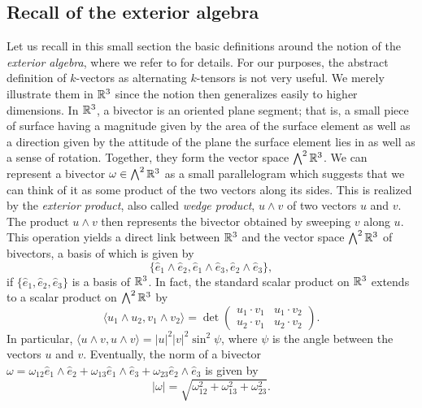 \subsection{Recall of the exterior algebra}
Let us recall in this small section the basic definitions around the notion of the \emph{exterior algebra}, where we refer to \cite{Lounesto2006} for details. For our purposes, the abstract definition of $k$-vectors as alternating $k$-tensors is not very useful. We merely illustrate them in $\mathbb{R}^3$ since the notion then generalizes easily to higher dimensions. In $\mathbb{R}^3$, a bivector is an oriented plane segment; that is, a small piece of surface having a magnitude given by the area of the surface element as well as a direction given by the attitude of the plane the surface element lies in as well as a sense of rotation. Together, they form the vector space $\bigwedge^2 \mathbb{R}^3$. We can represent a bivector $\omega \in \bigwedge^2 \mathbb{R}^3$ as a small parallelogram which suggests that we can think of it as some product of the two vectors along its sides. This is realized by the \emph{exterior product}, also called \emph{wedge product}, $u \wedge v$ of two vectors $u$ and $v$. The product $u \wedge v$ then represents the bivector obtained by sweeping $v$ along $u$. This operation yields a direct link between $\mathbb{R}^3$ and the vector space $\bigwedge^2 \mathbb{R}^3$ of bivectors, a basis of which is given by
\begin{equation}
 \{\hat{e}_1 \wedge \hat{e}_2, \hat{e}_1 \wedge \hat{e}_3, \hat{e}_2 \wedge \hat{e}_3\},
\end{equation}
if $\{\hat{e}_1, \hat{e}_2, \hat{e}_3\}$ is a basis of $\mathbb{R}^3$. In fact, the standard scalar product on $\mathbb{R}^3$ extends to a scalar product on $\bigwedge^2 \mathbb{R}^3$ by
\begin{equation}
\langle u_1 \wedge u_2 , v_1 \wedge v_2 \rangle = \det \left (\begin{array}{cc}
u_1 \cdot v_1 & u_1 \cdot v_2 \\ 
u_2 \cdot v_1 & u_2 \cdot v_2
\end{array}  \right).
\end{equation}
In particular, $\langle u \wedge v, u \wedge v \rangle = |u|^2 |v|^2 \sin^2\psi$, where $\psi$ is the angle between the vectors $u$ and $v$. Eventually, the norm of a bivector $\omega = \omega_{12} \hat{e}_1 \wedge \hat{e}_2 + \omega_{13} \hat{e}_1 \wedge \hat{e}_3 + \omega_{23} \hat{e}_2 \wedge \hat{e}_3$ is given by
\begin{equation}
|\omega| = \sqrt{\omega_{12}^2 + \omega_{13}^2 + \omega_{23}^2}.
\end{equation}
